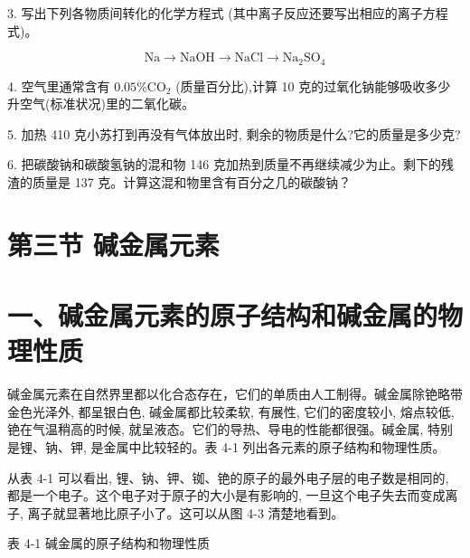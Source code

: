 \documentclass[10pt]{article}
\begin{document}
3. 写出下列各物质间转化的化学方程式 (其中离子反应还要写出相应的离子方程式)。

\[
\mathrm{{Na}} \rightarrow \mathrm{{NaOH}} \rightarrow \mathrm{{NaCl}} \rightarrow {\mathrm{{Na}}}_{2}{\mathrm{{SO}}}_{4}
\]

4. 空气里通常含有 \({0.05}\% {\mathrm{{CO}}}_{2}\) (质量百分比),计算 10 克的过氧化钠能够吸收多少升空气(标准状况)里的二氧化碳。

5. 加热 410 克小苏打到再没有气体放出时, 剩余的物质是什么?它的质量是多少克?

6. 把碳酸钠和碳酸氢钠的混和物 146 克加热到质量不再继续减少为止。剩下的残渣的质量是 137 克。计算这混和物里含有百分之几的碳酸钠？

\section*{第三节 碱金属元素}

\section*{一、碱金属元素的原子结构和碱金属的物理性质}

碱金属元素在自然界里都以化合态存在，它们的单质由人工制得。碱金属除铯略带金色光泽外, 都呈银白色, 碱金属都比较柔软, 有展性, 它们的密度较小, 熔点较低, 铯在气温稍高的时候, 就呈液态。它们的导热、导电的性能都很强。碱金属, 特别是锂、钠、钾, 是金属中比较轻的。表 4-1 列出各元素的原子结构和物理性质。

从表 4-1 可以看出, 锂、钠、钾、铷、铯的原子的最外电子层的电子数是相同的, 都是一个电子。这个电子对于原子的大小是有影响的, 一旦这个电子失去而变成离子, 离子就显著地比原子小了。这可以从图 4-3 清楚地看到。

表 4-1 碱金属的原子结构和物理性质
\end{document}
